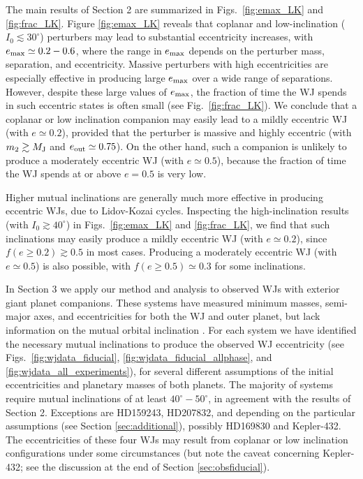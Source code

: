 \documentclass[12pt,useAMS, usenatbib]{mn2e}
\newcommand{\Max}{{\rm max}}
\newcommand{\Out}{{\rm out}}
\newcommand{\eout}{e_\Out}
\newcommand{\emax}{e_\Max}
\newcommand{\mjup}{M_{\rm J}}
\begin{document}
The main results of Section 2 are summarized in Figs.~\ref{fig:emax_LK} and \ref{fig:frac_LK}. Figure \ref{fig:emax_LK} reveals that coplanar and low-inclination ($I_0 \lesssim 30^\circ$) perturbers may lead to substantial eccentricity increases, with $\emax \simeq 0.2 - 0.6$, where the range in $\emax$ depends on the perturber mass, separation, and eccentricity.  Massive perturbers with high eccentricities are especially effective in producing large $\emax$ over a wide range of separations.  However, despite these large values of $\emax$, the fraction of time the WJ spends in such eccentric states is often small (see Fig.~\ref{fig:frac_LK}).  We conclude that a coplanar or low inclination companion may easily lead to a mildly eccentric WJ (with $e \simeq 0.2$), provided that the perturber is massive and highly eccentric (with $m_2 \gtrsim \mjup$ and $\eout \simeq 0.75$).  On the other hand, such a companion is unlikely to produce a moderately eccentric WJ (with $e \simeq 0.5$), because the fraction of time the WJ spends at or above $e = 0.5$ is very low.

Higher mutual inclinations are generally much more effective in producing eccentric WJs, due to Lidov-Kozai cycles.  Inspecting the high-inclination results (with $I_0 \gtrsim 40^\circ$) in Figs.~\ref{fig:emax_LK} and \ref{fig:frac_LK}, we find that such inclinations may easily produce a mildly eccentric WJ (with $e \simeq 0.2$), since $f(e \geq 0.2) \gtrsim 0.5$ in most cases.  Producing a moderately eccentric WJ (with $e \simeq 0.5$) is also possible, with $f(e \geq 0.5) \simeq 0.3$ for some inclinations.

In Section 3 we apply our method and analysis to observed WJs with exterior giant planet companions.  These systems have measured minimum masses, semi-major axes, and eccentricities for both the WJ and outer planet, but lack information on the mutual orbital inclination \citep[see Table 1 in][for measured system parameters]{antonini2016}.  For each system we have identified the necessary mutual inclinations to produce the observed WJ eccentricity (see Figs.~\ref{fig:wjdata_fiducial}, \ref{fig:wjdata_fiducial_allphase}, and \ref{fig:wjdata_all_experiments}), for several different assumptions of the initial eccentricities and planetary masses of both planets.  The majority of systems require mutual inclinations of at least $40^\circ - 50^\circ$, in agreement with the results of Section 2.  Exceptions are HD159243, HD207832, and depending on the particular assumptions (see Section \ref{sec:additional}), possibly HD169830 and Kepler-432.  The eccentricities of these four WJs may result from coplanar or low inclination configurations under some circumstances (but note the caveat concerning Kepler-432; see the discussion at the end of Section \ref{sec:obsfiducial}).  
\end{document}
